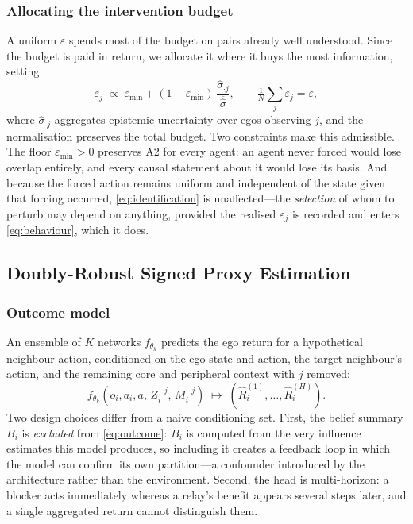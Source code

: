 \documentclass[conference]{IEEEtran}
\begin{document}
\subsubsection{Allocating the intervention budget}
A uniform $\varepsilon$ spends most of the budget on pairs already well understood. Since the budget is paid in return, we allocate it where it buys the most information, setting
\begin{equation}
\varepsilon_j \;\propto\; \varepsilon_{\min} + (1-\varepsilon_{\min})\,\frac{\hat\sigma_{\cdot j}}{\overline{\hat\sigma}},
\qquad
\tfrac{1}{N}\textstyle\sum_j \varepsilon_j=\varepsilon,
\label{eq:targeted}
\end{equation}
where $\hat\sigma_{\cdot j}$ aggregates epistemic uncertainty over egos observing $j$, and the normalisation preserves the total budget. Two constraints make this admissible. The floor $\varepsilon_{\min}>0$ preserves A2 for every agent: an agent never forced would lose overlap entirely, and every causal statement about it would lose its basis. And because the forced action remains uniform and independent of the state given that forcing occurred, \eqref{eq:identification} is unaffected---the \emph{selection} of whom to perturb may depend on anything, provided the realised $\varepsilon_j$ is recorded and enters \eqref{eq:behaviour}, which it does.

\subsection{Doubly-Robust Signed Proxy Estimation}

\subsubsection{Outcome model}
An ensemble of $K$ networks $f_{\theta_k}$ predicts the ego return for a hypothetical neighbour action, conditioned on the ego state and action, the target neighbour's action, and the remaining core and peripheral context with $j$ removed:
\begin{equation}
f_{\theta_k}\!\left(o_i,a_i,a,\,Z_i^{-j},\,M_i^{-j}\right)\;\longmapsto\;
\left(\hat{R}_i^{(1)},\dots,\hat{R}_i^{(H)}\right).
\label{eq:outcome}
\end{equation}
Two design choices differ from a naive conditioning set. First, the belief summary $B_i$ is \emph{excluded} from \eqref{eq:outcome}: $B_i$ is computed from the very influence estimates this model produces, so including it creates a feedback loop in which the model can confirm its own partition---a confounder introduced by the architecture rather than the environment. Second, the head is multi-horizon: a blocker acts immediately whereas a relay's benefit appears several steps later, and a single aggregated return cannot distinguish them.
\end{document}
